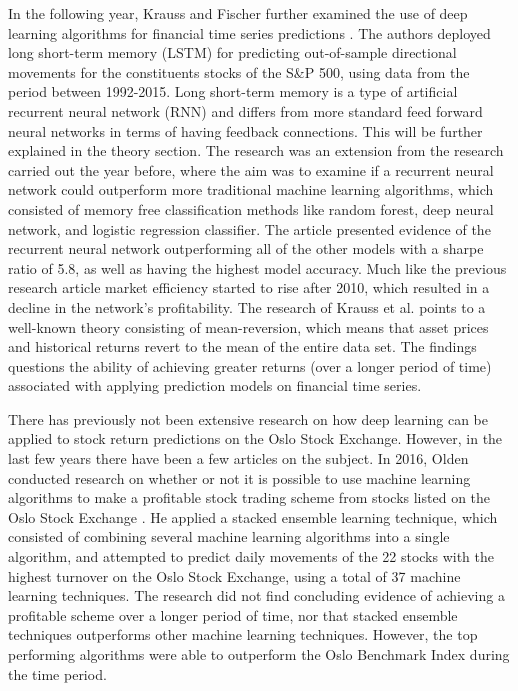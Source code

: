 \indent\newline
In the following year, Krauss and Fischer further examined the use of deep learning algorithms for financial time series predictions \cite{krauss}. The authors deployed long short-term memory (LSTM) for predicting out-of-sample directional movements for the constituents stocks of the S\&P 500, using data from the period between 1992-2015. Long short-term memory is a type of artificial recurrent neural network (RNN) and differs from more standard feed forward neural networks in terms of having feedback connections. This will be further explained in the theory section. The research was an extension from the research carried out the year before, where the aim was to examine if  a recurrent neural network could outperform more traditional machine learning algorithms, which consisted of memory free classification methods like random forest, deep neural network, and logistic regression classifier. The article presented evidence of the recurrent neural network outperforming all of the other models with a sharpe ratio of 5.8, as well as having the highest model accuracy. Much like the previous research article market efficiency started to rise after 2010, which resulted in a decline in the network's profitability. The research of Krauss et al. points to a well-known theory consisting of mean-reversion, which means that asset prices and historical returns revert to the mean of the entire data set. The findings questions the ability of achieving greater returns (over a longer period of time) associated with applying prediction models on financial time series.

\indent\newline
There has previously not been extensive research on how deep learning can be applied to stock return predictions on the Oslo Stock Exchange. However, in the last few years there have been a few articles on the subject. In 2016, Olden conducted research on whether or not it is possible to use machine learning algorithms to make a profitable stock trading scheme from stocks listed on the Oslo Stock Exchange \cite{olden}. He applied a stacked ensemble learning technique, which consisted of combining several machine learning algorithms into a single algorithm, and attempted to predict daily movements of the 22 stocks with the highest turnover on the Oslo Stock Exchange, using a total of 37 machine learning techniques. The research did not find concluding evidence of achieving a profitable scheme over a longer period of time, nor that stacked ensemble techniques outperforms other machine learning techniques. However, the top performing algorithms were able to outperform the Oslo Benchmark Index during the time period.    

